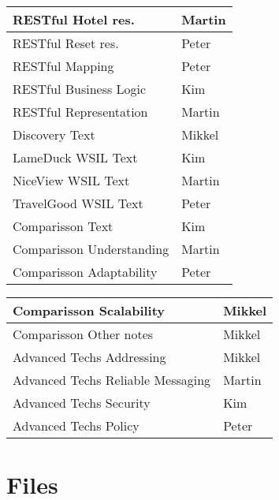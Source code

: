\begin{tabular}{|l|l|}
\hline RESTful Hotel res. & Martin \\ 
\hline RESTful Reset res. & Peter \\ 
\hline RESTful Mapping & Peter  \\ 
\hline RESTful Business Logic & Kim \\ 
\hline RESTful Representation & Martin  \\
\hline Discovery Text & Mikkel  \\
\hline LameDuck WSIL Text & Kim  \\
\hline NiceView WSIL Text & Martin \\
\hline TravelGood WSIL Text & Peter \\
\hline Comparisson Text & Kim  \\
\hline Comparisson Understanding & Martin   \\
\hline Comparisson Adaptability & Peter \\
\hline
\end{tabular}

\begin{tabular}{|l|l|}
\hline Comparisson Scalability & Mikkel \\
\hline Comparisson Other notes & Mikkel \\
\hline Advanced Techs Addressing  & Mikkel \\
\hline Advanced Techs Reliable Messaging & Martin \\
\hline Advanced Techs Security & Kim \\
\hline Advanced Techs Policy & Peter \\
\hline 
\end{tabular} 

\section{Files}

